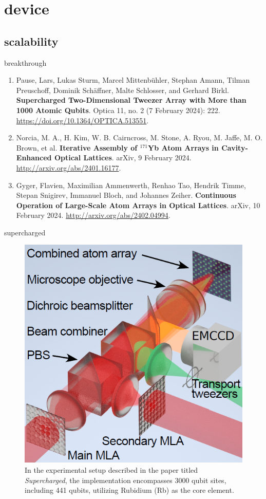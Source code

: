 \documentclass[18 pt]{beamer}
\begin{document}
\section{device}
\subsection{scalability}
\begin{frame}{breakthrough}
  \begin{enumerate}[itemsep=10pt]
    \item Pause, Lars, Lukas Sturm, Marcel Mittenbühler, Stephan Amann, Tilman Preuschoff, Dominik Schäffner, Malte Schlosser, and Gerhard Birkl. \textbf{Supercharged Two-Dimensional Tweezer Array with More than 1000 Atomic Qubits}. Optica 11, no. 2 (7 February 2024): 222. \url{https://doi.org/10.1364/OPTICA.513551}.
    \item Norcia, M. A., H. Kim, W. B. Cairncross, M. Stone, A. Ryou, M. Jaffe, M. O. Brown, et al. \textbf{Iterative Assembly of $^{171}$Yb Atom Arrays in Cavity-Enhanced Optical Lattices}. arXiv, 9 February 2024. \url{http://arxiv.org/abs/2401.16177}.
    \item Gyger, Flavien, Maximilian Ammenwerth, Renhao Tao, Hendrik Timme, Stepan Snigirev, Immanuel Bloch, and Johannes Zeiher. \textbf{Continuous Operation of Large-Scale Atom Arrays in Optical Lattices}. arXiv, 10 February 2024. \url{http://arxiv.org/abs/2402.04994}.
  \end{enumerate}
\end{frame}
\begin{frame}{supercharged}
\begin{figure}
  \includegraphics[width=.5\textwidth]{IMG/supercharhed.png}
  \caption{In the experimental setup described in the paper titled \textit{Supercharged}, the implementation encompasses 3000 qubit sites, including 441 qubits, utilizing Rubidium (Rb) as the core element.}
\end{figure}  
\end{frame}
\end{document}

